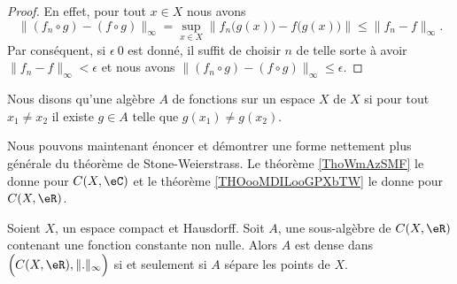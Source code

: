 \begin{proof}
    En effet, pour tout \( x\in X\) nous avons
    \begin{equation}
        \| (f_n\circ g)-(f\circ g) \|_{\infty}=\sup_{x\in X} \| f_n\big( g(x) \big)-f\big( g(x) \big) \|\leq \| f_n-f \|_{\infty}.
    \end{equation}
    Par conséquent, si \( \epsilon\>0\) est donné, il suffit de choisir \( n\) de telle sorte à avoir \( \| f_n-f \|_{\infty}<\epsilon\) et nous avons \( \| (f_n\circ g)-(f\circ g) \|_{\infty}\leq \epsilon\).
\end{proof}

\begin{definition}
    Nous disons qu'une algèbre \( A\) de fonctions sur un espace \( X\)  de \( X\) si pour tout \( x_1\neq x_2\) il existe \( g\in A\) telle que \( g(x_1)\neq g(x_2)\).
\end{definition}

Nous pouvons maintenant énoncer et démontrer une forme nettement plus générale du théorème de Stone-Weierstrass. Le théorème \ref{ThoWmAzSMF} le donne pour \( C(X,\eC)\) et le théorème \ref{THOooMDILooGPXbTW} le donne pour \( C(X,\eR)\).

\begin{theorem} \label{THOooMDILooGPXbTW}
    Soient \( X\), un espace compact et Hausdorff. Soit \( A\), une sous-algèbre de \( C(X,\eR)\) contenant une fonction constante non nulle. Alors \( A\) est dense dans \( \Big( C(X,\eR),\| . \|_{\infty}\Big)\) si et seulement si \( A\) sépare les points de \(X\).
\end{theorem}

